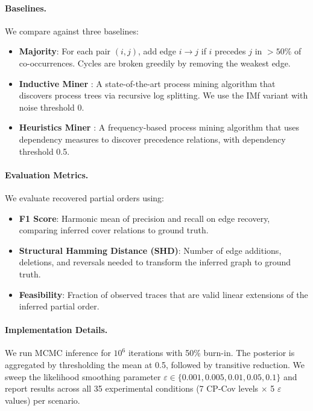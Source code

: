 \paragraph{Baselines.}
We compare against three baselines:
\begin{itemize}[leftmargin=*,nosep]
    \item \textbf{Majority}: For each pair $(i,j)$, add edge $i \to j$ if $i$ precedes $j$ in $>50\%$ of co-occurrences. Cycles are broken greedily by removing the weakest edge.
    \item \textbf{Inductive Miner} \citep{leemans2013discovering}: A state-of-the-art process mining algorithm that discovers process trees via recursive log splitting. We use the IMf variant with noise threshold 0.
    \item \textbf{Heuristics Miner} \citep{weijters2006process}: A frequency-based process mining algorithm that uses dependency measures to discover precedence relations, with dependency threshold 0.5.
\end{itemize}

\paragraph{Evaluation Metrics.}
We evaluate recovered partial orders using:
\begin{itemize}[leftmargin=*,nosep]
    \item \textbf{F1 Score}: Harmonic mean of precision and recall on edge recovery, comparing inferred cover relations to ground truth.
    \item \textbf{Structural Hamming Distance (SHD)}: Number of edge additions, deletions, and reversals needed to transform the inferred graph to ground truth.
    \item \textbf{Feasibility}: Fraction of observed traces that are valid linear extensions of the inferred partial order.
\end{itemize}

\paragraph{Implementation Details.}
We run MCMC inference for $10^6$ iterations with 50\% burn-in. The posterior is aggregated by thresholding the mean at 0.5, followed by transitive reduction. We sweep the likelihood smoothing parameter $\varepsilon \in \{0.001, 0.005, 0.01, 0.05, 0.1\}$ and report results across all 35 experimental conditions (7 CP-Cov levels $\times$ 5 $\varepsilon$ values) per scenario.


